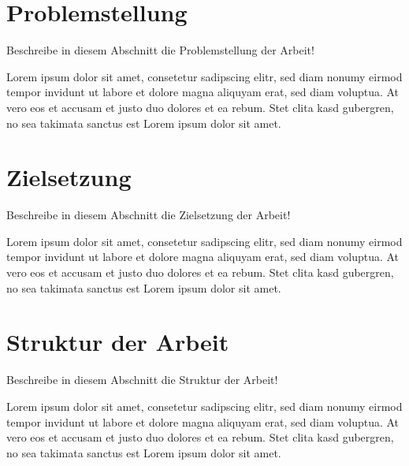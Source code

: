 \section{Problemstellung}
\label{sec:einleitung:problemstellung}
Beschreibe in diesem Abschnitt die Problemstellung der Arbeit!

Lorem ipsum dolor sit amet, consetetur sadipscing elitr, sed diam nonumy eirmod tempor invidunt ut labore et dolore magna aliquyam erat, sed diam voluptua. At vero eos et accusam et justo duo dolores et ea rebum. Stet clita kasd gubergren, no sea takimata sanctus est Lorem ipsum dolor sit amet. 

\section{Zielsetzung}
\label{sec:einleitung:zielsetzung}
Beschreibe in diesem Abschnitt die Zielsetzung der Arbeit!

Lorem ipsum dolor sit amet, consetetur sadipscing elitr, sed diam nonumy eirmod tempor invidunt ut labore et dolore magna aliquyam erat, sed diam voluptua. At vero eos et accusam et justo duo dolores et ea rebum. Stet clita kasd gubergren, no sea takimata sanctus est Lorem ipsum dolor sit amet. 

\section{Struktur der Arbeit}
\label{sec:einleitung:struktur}
Beschreibe in diesem Abschnitt die Struktur der Arbeit!

Lorem ipsum dolor sit amet, consetetur sadipscing elitr, sed diam nonumy eirmod tempor invidunt ut labore et dolore magna aliquyam erat, sed diam voluptua. At vero eos et accusam et justo duo dolores et ea rebum. Stet clita kasd gubergren, no sea takimata sanctus est Lorem ipsum dolor sit amet. 
